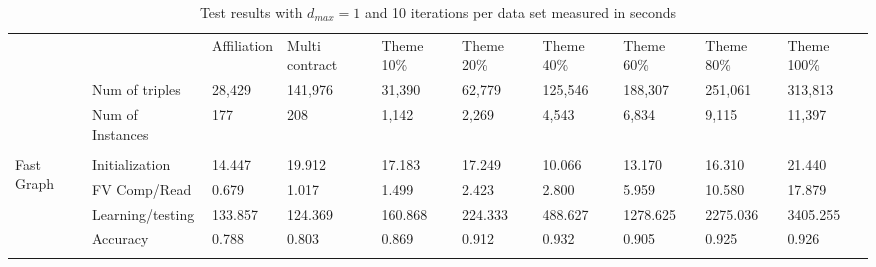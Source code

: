 \documentclass{easychair}
\begin{document}
\begin{table}
\centering
\caption{Test results with $d_{max}=1$ and 10 iterations per data set measured in seconds}
\label{table:test1}
\begin{tabular}{ll|l|l|l|l|l|l|l|l|}
\cline{3-10}
\multirow{3}{*}{}                                                                                       &                  & Affiliation & Multi contract & Theme 10\% & Theme 20\% & Theme 40\% & Theme 60\% & Theme 80\% & Theme 100\% \\ \cline{2-10} 
                                                                                                        & Num of triples   & 28,429      & 141,976        & 31,390     & 62,779     & 125,546    & 188,307    & 251,061    & 313,813     \\ \cline{2-10} 
                                                                                                        & Num of Instances & 177         & 208            & 1,142      & 2,269      & 4,543      & 6,834      & 9,115      & 11,397      \\ \hline
\multicolumn{1}{|l|}{}                                                                                  &                  &             &                &            &            &            &            &            &             \\ \hline
\multicolumn{1}{|l|}{\multirow{4}{*}{Fast Graph}}                                                       & Initialization   & 14.447      & 19.912         & 17.183     & 17.249     & 10.066     & 13.170     & 16.310     & 21.440      \\ \cline{2-10} 
\multicolumn{1}{|l|}{}                                                                                  & FV Comp/Read     & 0.679       & 1.017          & 1.499      & 2.423      & 2.800      & 5.959      & 10.580     & 17.879      \\ \cline{2-10} 
\multicolumn{1}{|l|}{}                                                                                  & Learning/testing & 133.857     & 124.369        & 160.868    & 224.333    & 488.627    & 1278.625   & 2275.036   & 3405.255    \\ \cline{2-10} 
\multicolumn{1}{|l|}{}                                                                                  & Accuracy         & 0.788       & 0.803          & 0.869      & 0.912      & 0.932      & 0.905      & 0.925      & 0.926       \\ \hline
\multicolumn{1}{|l|}{}                                                                                  &                  &             &                &            &            &            &            &            &             \\ \hline

\end{tabular}
\end{table}
\end{document}
